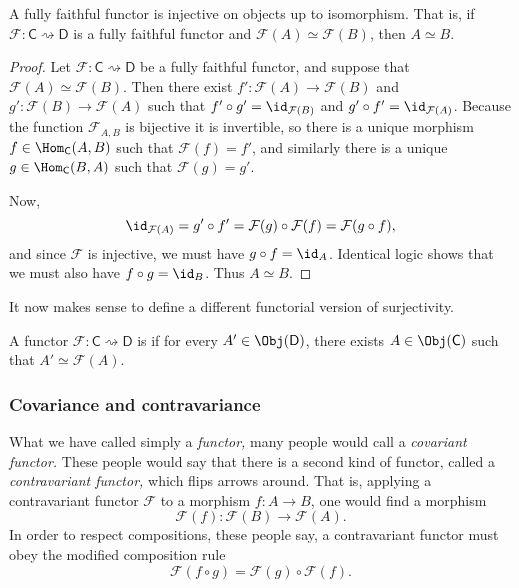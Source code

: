 \documentclass[notes.tex]{subfiles}
\begin{document}
\begin{lemma}
  \label{lemma:fullyfaithfulfunctorinjectiveuptoisomorphism}
  A fully faithful functor is injective on objects up to isomorphism. That is, if  $\mathcal{F}\colon \mathsf{C} \rightsquigarrow \mathsf{D}$ is a fully faithful functor and $\mathcal{F}(A) \simeq \mathcal{F}(B)$, then $A \simeq B$.
\end{lemma}
\begin{proof}
  Let $\mathcal{F}\colon \mathsf{C} \rightsquigarrow \mathsf{D}$ be a fully faithful functor, and suppose that $\mathcal{F}(A) \simeq \mathcal{F}(B)$. Then there exist $f'\colon \mathcal{F}(A) \to \mathcal{F}(B)$ and $g'\colon \mathcal{F}(B) \to \mathcal{F}(A)$ such that $f' \circ g' = \id_{\mathcal{F}(B)}$ and $g' \circ f' = \id_{\mathcal{F}(A)}$. Because the function $\mathcal{F}_{A, B}$ is bijective it is invertible, so there is a unique morphism $f \in \Hom_{\mathsf{C}}(A, B)$ such that $\mathcal{F}(f) = f'$, and similarly there is a unique $g \in \Hom_{\mathsf{C}}(B, A)$ such that $\mathcal{F}(g) = g'$.

  Now,
  \begin{equation*}
    \id_{\mathcal{F}(A)} = g' \circ f' = \mathcal{F}(g) \circ \mathcal{F}(f) = \mathcal{F}(g \circ f),
  \end{equation*}
  and since $\mathcal{F}$ is injective, we must have $g \circ f = \id_{A}$. Identical logic shows that we must also have $f \circ g = \id_{B}$. Thus $A \simeq B$.
\end{proof}

It now makes sense to define a different functorial version of surjectivity.

\begin{definition}
  \label{def:essentiallysurjective}
  A functor $\mathcal{F}\colon \mathsf{C} \rightsquigarrow \mathsf{D}$ is  if for every $A' \in \Obj(\mathsf{D})$, there exists $A \in \Obj(\mathsf{C})$ such that $A' \simeq \mathcal{F}(A)$.
\end{definition}


\subsubsection{Covariance and contravariance}

What we have called simply a \emph{functor,} many people would call a \emph{covariant functor.} These people would say that there is a second kind of functor, called a \emph{contravariant functor,} which flips arrows around. That is, applying a contravariant functor $\mathcal{F}$ to a morphism $f\colon A \to  B$, one would find a morphism
\begin{equation*}
  \mathcal{F}(f)\colon \mathcal{F}(B) \to \mathcal{F}(A).
\end{equation*}
In order to respect compositions, these people say, a contravariant functor must obey the modified composition rule
\begin{equation*}
  \mathcal{F}(f \circ g) = \mathcal{F}(g) \circ \mathcal{F}(f).
\end{equation*}
\end{document}
